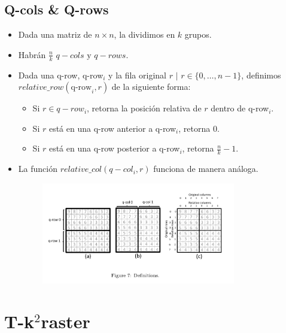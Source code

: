 \documentclass{article}
\begin{document}
\subsection*{Q-cols \& Q-rows}
\begin{itemize}
  \item Dada una matriz de $n \times n$, la dividimos en $k$ grupos.
  \item Habrán $\frac{n}{k}$ $q-cols \text{ y } q-rows$.
  \item Dada una q-row, q-row$_i$ y la fila original $r \text{ | } r \in
    \{0,\ldots,n-1\}$, definimos $relative\_row(\text{q-row}_i,r)$ de la
    siguiente forma:
    \begin{itemize}
      \item Si $r \in q-row_i$, retorna la posición relativa de $r$ dentro de
        q-row$_i$.
      \item Si $r$ está en una q-row anterior a q-row$_i$, retorna 0.
      \item Si $r$ está en una q-row posterior a q-row$_i$, retorna
        $\frac{n}{k}-1$.
    \end{itemize}
  \item La función $relative\_col(q-col_i, r)$ funciona de manera análoga.
    \begin{figure}[h]
      \centering
      \includegraphics[width=0.8\textwidth]{../images/qrow.png}
    \end{figure}

\end{itemize}

\section*{T-k$^2$raster}
\end{document}
